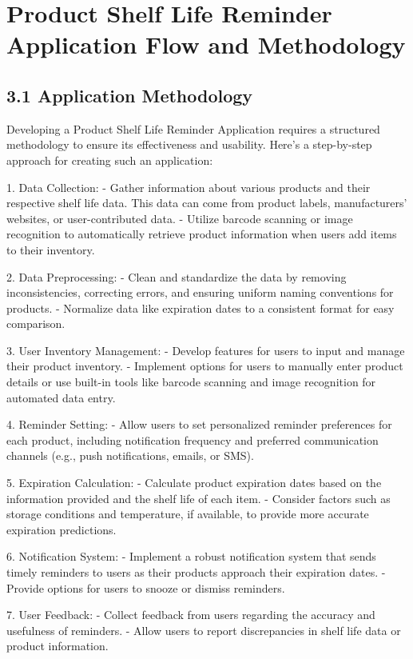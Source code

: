 \chapter{Product Shelf Life Reminder Application Flow and Methodology}
\section{3.1 Application Methodology}



Developing a Product Shelf Life Reminder Application requires a structured methodology to ensure its effectiveness and usability. Here's a step-by-step approach for creating such an application:

1. Data Collection:
   - Gather information about various products and their respective shelf life data. This data can come from product labels, manufacturers' websites, or user-contributed data.
   - Utilize barcode scanning or image recognition to automatically retrieve product information when users add items to their inventory.

2. Data Preprocessing:
   - Clean and standardize the data by removing inconsistencies, correcting errors, and ensuring uniform naming conventions for products.
   - Normalize data like expiration dates to a consistent format for easy comparison.

3. User Inventory Management:
   - Develop features for users to input and manage their product inventory.
   - Implement options for users to manually enter product details or use built-in tools like barcode scanning and image recognition for automated data entry.

4. Reminder Setting:
   - Allow users to set personalized reminder preferences for each product, including notification frequency and preferred communication channels (e.g., push notifications, emails, or SMS).

5. Expiration Calculation:
   - Calculate product expiration dates based on the information provided and the shelf life of each item.
   - Consider factors such as storage conditions and temperature, if available, to provide more accurate expiration predictions.

6. Notification System:
   - Implement a robust notification system that sends timely reminders to users as their products approach their expiration dates.
   - Provide options for users to snooze or dismiss reminders.

7. User Feedback:
   - Collect feedback from users regarding the accuracy and usefulness of reminders.
   - Allow users to report discrepancies in shelf life data or product information.

